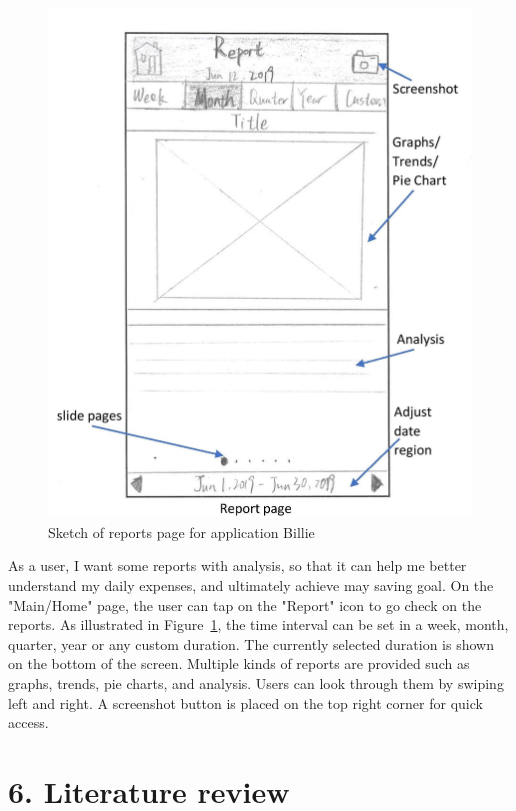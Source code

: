 \documentclass{sigchi}
\begin{document}
\begin{figure}[h!]
\centering
  \includegraphics[width=0.6\columnwidth]{24-report-page.jpg}
  \caption{Sketch of reports page for application Billie}
  \label{fig:figure39}
\end{figure}
As a user, I want some reports with analysis, so that it can help me better understand my daily expenses, and ultimately achieve may saving goal. On the "Main/Home" page, the user can tap on the "Report" icon to go check on the reports. As illustrated in Figure~\ref{fig:figure39}, the time interval can be set in a week, month, quarter, year or any custom duration. The currently selected duration is shown on the bottom of the screen. Multiple kinds of reports are provided such as graphs, trends, pie charts, and analysis. Users can look through them by swiping left and right. A screenshot button is placed on the top right corner for quick access.

\section{6. Literature review}
\end{document}
